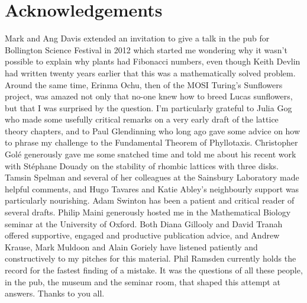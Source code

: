 


\chapter*{Acknowledgements}
Mark and Ang Davis extended an invitation to give a talk in the pub for Bollington Science Festival in 2012 which started me wondering why it wasn't possible to explain why plants had Fibonacci numbers, even though Keith Devlin had written twenty years earlier that this was a mathematically solved problem. Around the same time, Erinma Ochu, then of the MOSI Turing's Sunflowers project, was amazed not only that no-one knew how to breed Lucas sunflowers, but that I was surprised by the question.  
I'm particularly grateful to Julia Gog who made some usefully critical remarks on a very early draft of the lattice theory chapters, and to Paul Glendinning who long ago gave some advice on how to phrase my challenge to the Fundamental Theorem of Phyllotaxis.
Christopher Golé generously gave me some snatched time and told me about his recent work with Stéphane Douady on the stability of rhombic lattices with three disks. Tamsin Spelman and several of her colleagues at the Sainsbury Laboratory made helpful comments, and Hugo Tavares and Katie Abley's neighbourly support was particularly nourishing. Adam Swinton has been a patient and critical reader of several drafts.   Philip Maini generously hosted me in the Mathematical Biology seminar at the University of Oxford. Both Diana Gillooly and David Tranah offered supportive, engaged and productive publication advice, and Andrew Krause, Mark Muldoon and Alain Goriely have listened patiently and constructively to my pitches for this material. Phil Ramsden currently holds the record for the fastest finding of a mistake. 
It was the questions of all these people, in the pub, the museum and the seminar room, that shaped this attempt at answers.  Thanks to you all. 

